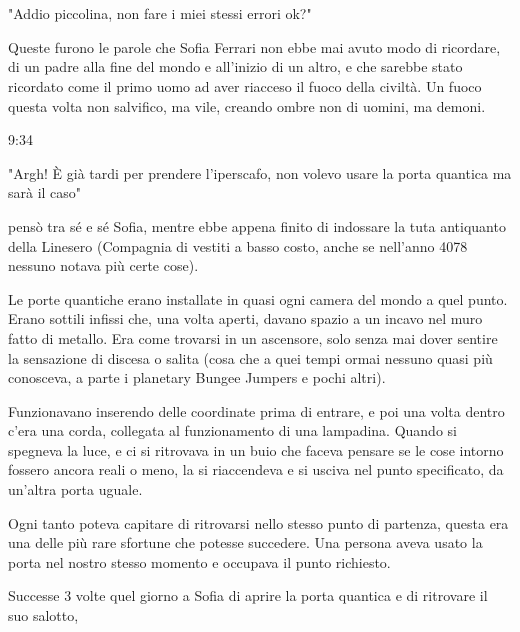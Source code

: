 \mainmatter

\chapter{\phantom{text}}

"Addio piccolina, non fare i miei stessi errori ok?"

Queste furono le parole che Sofia Ferrari non ebbe mai avuto modo di ricordare, di un padre alla fine del mondo e all'inizio di un altro, e che sarebbe stato ricordato come il primo uomo ad aver riacceso il fuoco della civiltà. Un fuoco questa volta non salvifico, ma vile, creando ombre non di uomini, ma demoni.

\begin{center}
	{\Large 9:34}
\end{center}

"Argh! È già tardi per prendere l'iperscafo, non volevo usare la porta quantica ma sarà il caso" 

pensò tra sé e sé Sofia, mentre ebbe appena finito di indossare la tuta antiquanto della Linesero (Compagnia di vestiti a basso costo, anche se nell'anno 4078 nessuno notava più certe cose).

Le porte quantiche erano installate in quasi ogni camera del mondo a quel punto. Erano sottili infissi che, una volta aperti, davano spazio a un incavo nel muro fatto di metallo. Era come trovarsi in un ascensore, solo senza mai dover sentire la sensazione di discesa o salita (cosa che a quei tempi ormai nessuno quasi più conosceva, a parte i planetary Bungee Jumpers e pochi altri).

Funzionavano inserendo delle coordinate prima di entrare, e poi una volta dentro c'era una corda, collegata al funzionamento di una lampadina. Quando si spegneva la luce, e ci si ritrovava in un buio che faceva pensare se le cose intorno fossero ancora reali o meno, la si riaccendeva e si usciva nel punto specificato, da un'altra porta uguale.

Ogni tanto poteva capitare di ritrovarsi nello stesso punto di partenza, questa era una delle più rare sfortune che potesse succedere. Una persona aveva usato la porta nel nostro stesso momento e occupava il punto richiesto.

Successe 3 volte quel giorno a Sofia di aprire la porta quantica e di ritrovare il suo salotto,
